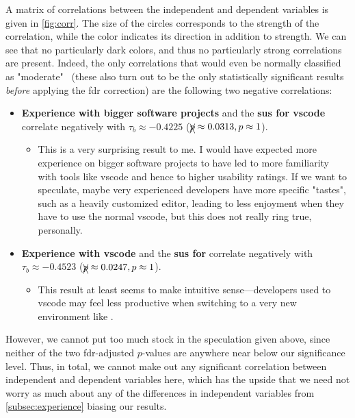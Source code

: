 \documentclass[../thesis]{subfiles}
\begin{document}
A matrix of correlations between the independent and dependent variables is given in \cref{fig:corr}.
The size of the circles corresponds to the strength of the correlation, while the color indicates its direction in addition to strength.
We can see that no particularly dark colors, and thus no particularly strong correlations are present.
Indeed, the only correlations that would even be normally classified as "moderate"~\cite{akoglu2018} (these also turn out to be the only statistically significant results \emph{before} applying the \gls{fdr} correction) are the following two negative correlations:
\begin{itemize}
	\item \textbf{Experience with bigger software projects} and the \textbf{\gls{sus} for \gls{vscode}} correlate negatively with $\tau_b \approx -0.4225$ ($\xcancel{p} \approx 0.0313, p \approx 1$).
	      \begin{itemize}
		      \item This is a very surprising result to me.
		            I would have expected more experience on bigger software projects to have led to more familiarity with tools like \gls{vscode} and hence to higher usability ratings.
		            If we want to speculate, maybe very experienced developers have more specific "tastes", such as a heavily customized editor, leading to less enjoyment when they have to use the normal \gls{vscode}, but this does not really ring true, personally.
	      \end{itemize}
	\item \textbf{Experience with \gls{vscode}} and the \textbf{\gls{sus} for \SEE{}} correlate negatively with $\tau_b \approx -0.4523$ ($\xcancel{p} \approx 0.0247, p \approx 1$).
	      \begin{itemize}
		      \item This result at least seems to make intuitive sense---developers used to \gls{vscode} may feel less productive when switching to a very new environment like \SEE{}.
	      \end{itemize}
\end{itemize}

However, we cannot put too much stock in the speculation given above, since neither of the two \gls{fdr}-adjusted $p$-values are anywhere near below our significance level.
Thus, in total, we cannot make out any significant correlation between independent and dependent variables here, which has the upside that we need not worry as much about any of the differences in independent variables from \cref{subsec:experience} biasing our results.
\end{document}

